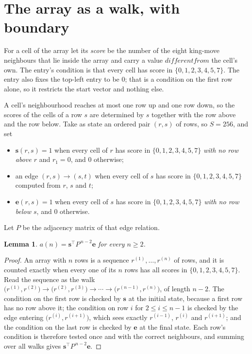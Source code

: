 \documentclass[11pt,a4paper]{article}
\theoremstyle{plain}
\newtheorem{lemma}[theorem]{Lemma}
\theoremstyle{definition}
\begin{document}
\section{The array as a walk, with boundary}

For a cell of the array let its \emph{score} be the number of the eight king-move neighbours that lie inside
the array and carry a value $different from$ the cell's own. The entry's condition is that every cell
has score in $\{0,1,2,3,4,5,7\}$. The entry also fixes the top-left entry to be $0$; that is a condition on the first row alone, so it restricts the start vector and nothing else.

A cell's neighbourhood reaches at most one row up and one row down, so the scores of the
cells of a row $s$ are determined by $s$ together with the row above and the row below.
Take as state an ordered pair $(r,s)$ of rows, so $S=256$, and set
\begin{itemize}
\item $\mathbf{s}(r,s)=1$ when every cell of $r$ has score in $\{0,1,2,3,4,5,7\}$ \emph{with no row
above $r$} and $r_1=0$, and $0$ otherwise;
\item an edge $(r,s)\to(s,t)$ when every cell of $s$ has score in $\{0,1,2,3,4,5,7\}$ computed from
$r$, $s$ and $t$;
\item $\mathbf{e}(r,s)=1$ when every cell of $s$ has score in $\{0,1,2,3,4,5,7\}$ \emph{with no row
below $s$}, and $0$ otherwise.
\end{itemize}
Let $P$ be the adjacency matrix of that edge relation.

\begin{lemma}\label{lem:walk}
$a(n)=\mathbf{s}^{\!\top}P^{\,n-2}\mathbf{e}$ for every $n\ge2$.
\end{lemma}

\begin{proof}
An array with $n$ rows is a sequence $r^{(1)},\dots,r^{(n)}$ of rows, and it is counted
exactly when every one of its $n$ rows has all scores in $\{0,1,2,3,4,5,7\}$. Read the sequence as the
walk $\bigl(r^{(1)},r^{(2)}\bigr)\to\bigl(r^{(2)},r^{(3)}\bigr)\to\cdots\to
\bigl(r^{(n-1)},r^{(n)}\bigr)$, of length $n-2$. The condition on the first row is
checked by $\mathbf{s}$ at the initial state, because a first row has no row above it; the
condition on row $i$ for $2\le i\le n-1$ is checked by the edge entering
$\bigl(r^{(i)},r^{(i+1)}\bigr)$, which sees exactly $r^{(i-1)}$, $r^{(i)}$ and
$r^{(i+1)}$; and the condition on the last row is checked by $\mathbf{e}$ at the final
state. Each row's condition is therefore tested once and with the correct neighbours, and
summing over all walks gives $\mathbf{s}^{\!\top}P^{\,n-2}\mathbf{e}$.
\end{proof}
\end{document}
